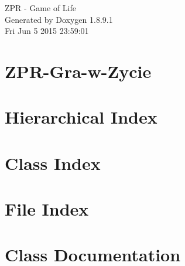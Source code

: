 \documentclass[twoside]{book}
\newcommand{\+}{\discretionary{\mbox{\scriptsize$\hookleftarrow$}}{}{}}
\newcommand{\clearemptydoublepage}{%
  \newpage{\pagestyle{empty}\cleardoublepage}%
}
\begin{document}
\hypersetup{pageanchor=false,
             bookmarks=true,
             bookmarksnumbered=true,
             pdfencoding=unicode
            }
\begin{titlepage}
\vspace*{7cm}
\begin{center}%
{\Large Z\+P\+R -\/ Game of Life }\\
\vspace*{1cm}
{\large Generated by Doxygen 1.8.9.1}\\
\vspace*{0.5cm}
{\small Fri Jun 5 2015 23:59:01}\\
\end{center}
\end{titlepage}
\clearemptydoublepage
\tableofcontents
\clearemptydoublepage
{}
\hypersetup{pageanchor=true}

\chapter{Z\+P\+R-\/\+Gra-\/w-\/\+Zycie}
\label{md__r_e_a_d_m_e}
\hypertarget{md__r_e_a_d_m_e}{}

\chapter{Hierarchical Index}

\chapter{Class Index}

\chapter{File Index}

\chapter{Class Documentation}













































\end{document}
